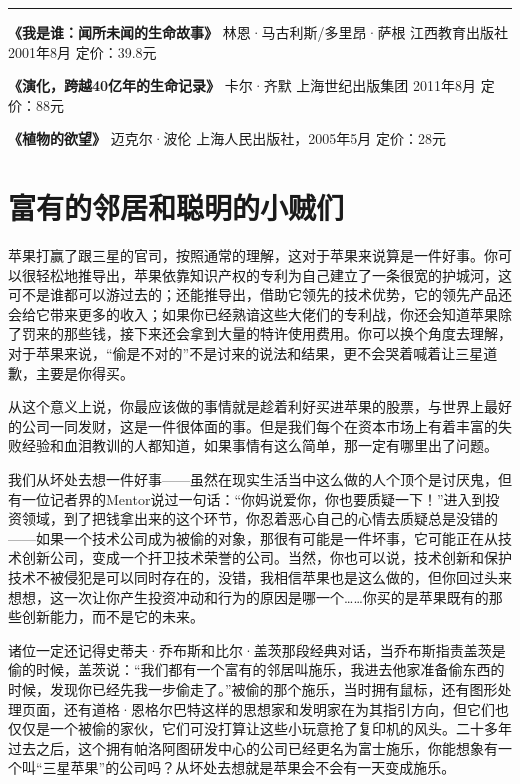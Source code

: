 \begin{center}\rule{3in}{0.4pt}\end{center}

\textbf{《我是谁：闻所未闻的生命故事》} 林恩·马古利斯/多里昂·萨根
江西教育出版社 2001年8月 定价：39.8元

\textbf{《演化，跨越40亿年的生命记录》} 卡尔·齐默 上海世纪出版集团
2011年8月 定价：88元

\textbf{《植物的欲望》} 迈克尔·波伦 上海人民出版社，2005年5月 定价：28元

\section{富有的邻居和聪明的小贼们}

苹果打赢了跟三星的官司，按照通常的理解，这对于苹果来说算是一件好事。你可以很轻松地推导出，苹果依靠知识产权的专利为自己建立了一条很宽的护城河，这可不是谁都可以游过去的；还能推导出，借助它领先的技术优势，它的领先产品还会给它带来更多的收入；如果你已经熟谙这些大佬们的专利战，你还会知道苹果除了罚来的那些钱，接下来还会拿到大量的特许使用费用。你可以换个角度去理解，对于苹果来说，``偷是不对的''不是讨来的说法和结果，更不会哭着喊着让三星道歉，主要是你得买。

从这个意义上说，你最应该做的事情就是趁着利好买进苹果的股票，与世界上最好的公司一同发财，这是一件很体面的事。但是我们每个在资本市场上有着丰富的失败经验和血泪教训的人都知道，如果事情有这么简单，那一定有哪里出了问题。

我们从坏处去想一件好事------虽然在现实生活当中这么做的人个顶个是讨厌鬼，但有一位记者界的Mentor说过一句话：``你妈说爱你，你也要质疑一下！''进入到投资领域，到了把钱拿出来的这个环节，你忍着恶心自己的心情去质疑总是没错的------如果一个技术公司成为被偷的对象，那很有可能是一件坏事，它可能正在从技术创新公司，变成一个扞卫技术荣誉的公司。当然，你也可以说，技术创新和保护技术不被侵犯是可以同时存在的，没错，我相信苹果也是这么做的，但你回过头来想想，这一次让你产生投资冲动和行为的原因是哪一个\ldots{}\ldots{}你买的是苹果既有的那些创新能力，而不是它的未来。

诸位一定还记得史蒂夫·乔布斯和比尔·盖茨那段经典对话，当乔布斯指责盖茨是偷的时候，盖茨说：``我们都有一个富有的邻居叫施乐，我进去他家准备偷东西的时候，发现你已经先我一步偷走了。''被偷的那个施乐，当时拥有鼠标，还有图形处理页面，还有道格·恩格尔巴特这样的思想家和发明家在为其指引方向，但它们也仅仅是一个被偷的家伙，它们可没打算让这些小玩意抢了复印机的风头。二十多年过去之后，这个拥有帕洛阿图研发中心的公司已经更名为富士施乐，你能想象有一个叫``三星苹果''的公司吗？从坏处去想就是苹果会不会有一天变成施乐。

